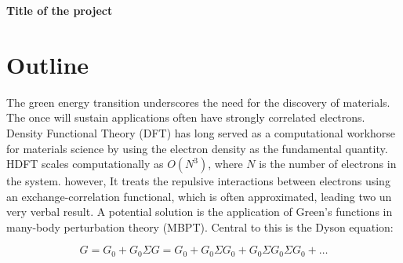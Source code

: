 \documentclass[11pt]{article} %
\begin{document}
\begin{center}
\large{\bf Title of the project}
\end{center}

\section*{Outline}
The green energy transition underscores the need for the discovery of materials. The once will sustain applications often have strongly correlated electrons. Density Functional Theory (DFT) has long served as a computational workhorse for materials science by using the electron density as the fundamental quantity. HDFT scales computationally as \( O(N^3) \), where \( N \) is the number of electrons in the system. however, It treats the repulsive interactions between electrons using an exchange-correlation functional, which is often approximated, leading two un very verbal result. A potential solution is the application of Green's functions in many-body perturbation theory (MBPT). Central to this is the Dyson equation:

\begin{equation}
    G = G_0 + G_0 \Sigma G = G_0 + G_0 \Sigma G_0 + G_0 \Sigma G_0 \Sigma G_0 + \ldots
\end{equation}
\end{document}
